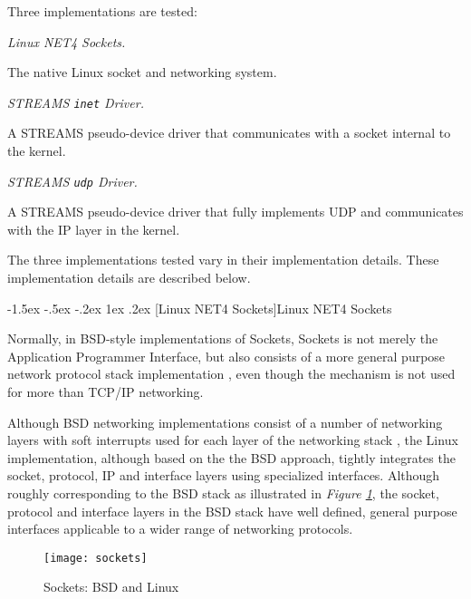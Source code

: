 \documentclass[letterpaper,final,notitlepage,twocolumn,10pt,twoside]{article}
\makeatletter
\renewcommand\subsection{\@startsection{subsection}{2}{\z@}%
                                     {-1.5ex \@plus -.5ex \@minus -.2ex}%
                                     {1ex \@plus .2ex}%
                                     {\normalfont\normalsize\bfseries}}
\makeatother
\begin{document}
Three implementations are tested:

\begin{description}

\item {\it Linux NET4 Sockets.}

The native Linux socket and networking system.

\item {\it STREAMS {\tt inet} Driver.}

A STREAMS pseudo-device driver that communicates with a socket
internal to the kernel.

\item {\it STREAMS {\tt udp} Driver.}

A STREAMS pseudo-device driver that fully implements UDP and
communicates with the IP layer in the kernel.

\end{description}

The three implementations tested vary in their implementation details.  These
implementation details are described below.

\subsection[Linux NET4 Sockets]{Linux NET4 Sockets}

Normally, in BSD-style implementations of Sockets, Sockets is not merely the
Application Programmer Interface, but also consists of a more general purpose
network protocol stack implementation \cite[]{bsd}, even though the mechanism
is not used for more than TCP/IP networking.  \cite[]{magic}

Although BSD networking implementations consist of a number of networking
layers with soft interrupts used for each layer of the networking stack
\cite[]{bsd}, the Linux implementation, although based on the the BSD
approach, tightly integrates the socket, protocol, IP and interface layers
using specialized interfaces.  Although roughly corresponding to the BSD stack
as illustrated in \textit{Figure \ref{figure:sockets}}, the socket, protocol
and interface layers in the BSD stack have well defined, general purpose
interfaces applicable to a wider range of networking protocols.

\begin{figure}[htp]
\center\texttt{[image: sockets]}
\caption[Sockets: BSD and Linux]{Sockets: BSD and Linux}
\label{figure:sockets}
\end{figure}
\end{document}
